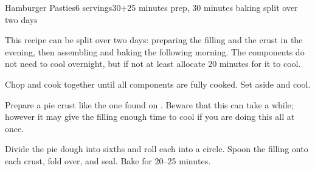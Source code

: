 \documentclass[../Cookbook.tex]{subfiles}
\begin{document}
\begin{recipe}{Hamburger Pasties}{6 servings}{30+25 minutes prep, 30 minutes baking split over two days}

This recipe can be split over two days: preparing the filling and the crust in the evening, then assembling and baking the following morning. The components do not need to cool overnight, but if not at least allocate 20 minutes for it to cool.

Chop and cook together until all components are fully cooked. Set aside and cool.

\newstep
Prepare a pie crust like the one found on . Beware that this can take a while; however it may give the filling enough time to cool if you are doing this all at once.

\newstep
{}
Divide the pie dough into sixths and roll each into a circle. Spoon the filling onto each crust, fold over, and seal. Bake for 20--25 minutes.

\end{recipe}
\end{document}
